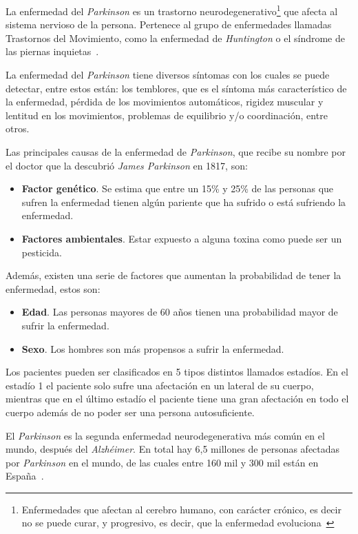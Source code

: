  \label{intro}

La enfermedad del \textit{Parkinson} es un trastorno neurodegenerativo\footnote{Enfermedades que afectan al cerebro humano, con carácter crónico, es decir no se puede curar, y progresivo, es decir, que la enfermedad evoluciona~\cite{jpndresearch2017,cron}} que afecta al sistema nervioso de la persona. Pertenece al grupo de enfermedades llamadas Trastornos del Movimiento, como la enfermedad de \textit{Huntington} o el síndrome de las piernas inquietas~\cite{trasmov,p1,p2,p3}.

La enfermedad del \textit{Parkinson} tiene diversos síntomas con los cuales se puede detectar, entre estos están: los temblores, que es el síntoma más característico de la enfermedad, pérdida de los movimientos automáticos, rigidez muscular y lentitud en los movimientos, problemas de equilibrio y/o coordinación, entre otros.

Las principales causas de la enfermedad de \textit{Parkinson}, que recibe su nombre por el doctor que la descubrió \textit{James Parkinson} en 1817, son:
\begin{itemize}
	\item \textbf{Factor genético}. Se estima que entre un 15\% y 25\% de las personas que sufren la enfermedad tienen algún pariente que ha sufrido o está sufriendo la enfermedad.
	\item \textbf{Factores ambientales}. Estar expuesto a alguna toxina como puede ser un pesticida.
\end{itemize}

Además, existen una serie de factores que aumentan la probabilidad de tener la enfermedad, estos son:
\begin{itemize}
	\item \textbf{Edad}. Las personas mayores de 60 años tienen una probabilidad mayor de sufrir la enfermedad.
	\item \textbf{Sexo}. Los hombres son más propensos a sufrir la enfermedad.
\end{itemize}

Los pacientes pueden ser clasificados en 5 tipos distintos llamados estadíos. En el estadío 1 el paciente solo sufre una afectación en un lateral de su cuerpo, mientras que en el último estadío el paciente tiene una gran afectación en todo el cuerpo además de no poder ser una persona autosuficiente.

El \textit{Parkinson} es la segunda enfermedad neurodegenerativa más común en el mundo, después del \textit{Alzhéimer}. En total hay 6,5 millones de personas afectadas por \textit{Parkinson} en el mundo, de las cuales entre 160 mil y 300 mil están en España~\cite{curemoselparkinson2020}.

